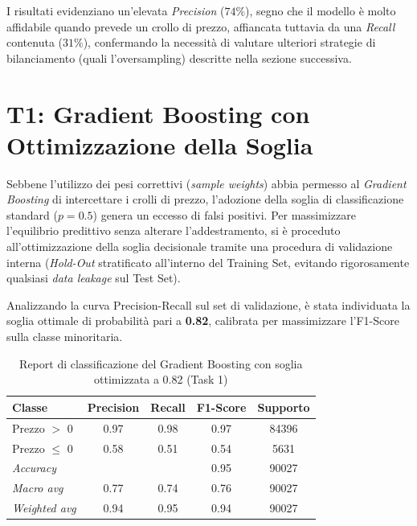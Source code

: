 I risultati evidenziano un'elevata \textit{Precision} ($74\%$), segno che il modello è molto affidabile quando prevede un crollo di prezzo, affiancata tuttavia da una \textit{Recall} contenuta ($31\%$), confermando la necessità di valutare ulteriori strategie di bilanciamento (quali l'oversampling) descritte nella sezione successiva.

\section{T1: Gradient Boosting con Ottimizzazione della Soglia}
\label{sec:t1_gradient_boosting_soglia}

Sebbene l'utilizzo dei pesi correttivi (\textit{sample weights}) abbia permesso al \textit{Gradient Boosting} di intercettare i crolli di prezzo, l'adozione della soglia di classificazione standard ($p = 0.5$) genera un eccesso di falsi positivi. Per massimizzare l'equilibrio predittivo senza alterare l'addestramento, si è proceduto all'ottimizzazione della soglia decisionale tramite una procedura di validazione interna (\textit{Hold-Out} stratificato all'interno del Training Set, evitando rigorosamente qualsiasi \textit{data leakage} sul Test Set).

Analizzando la curva Precision-Recall sul set di validazione, è stata individuata la soglia ottimale di probabilità pari a \textbf{0.82}, calibrata per massimizzare l'F1-Score sulla classe minoritaria.

\begin{table}[htbp]
    \centering
    \caption{Report di classificazione del Gradient Boosting con soglia ottimizzata a 0.82 (Task 1)}
    \label{tab:report_gb_soglia_task1}
    \begin{tabular}{|l|c|c|c|c|}
        \hline
        \textbf{Classe} & \textbf{Precision} & \textbf{Recall} & \textbf{F1-Score} & \textbf{Supporto} \\ \hline
        Prezzo $>$ 0    & 0.97 & 0.98 & 0.97 & 84396 \\ \hline
        Prezzo $\leq$ 0 & 0.58 & 0.51 & 0.54 & 5631  \\ \hline
        \textit{Accuracy}     & \multicolumn{2}{c|}{} & 0.95 & 90027 \\ \hline
        \textit{Macro avg}    & 0.77 & 0.74 & 0.76 & 90027 \\ \hline
        \textit{Weighted avg} & 0.94 & 0.95 & 0.94 & 90027 \\ \hline
    \end{tabular}
\end{table}

